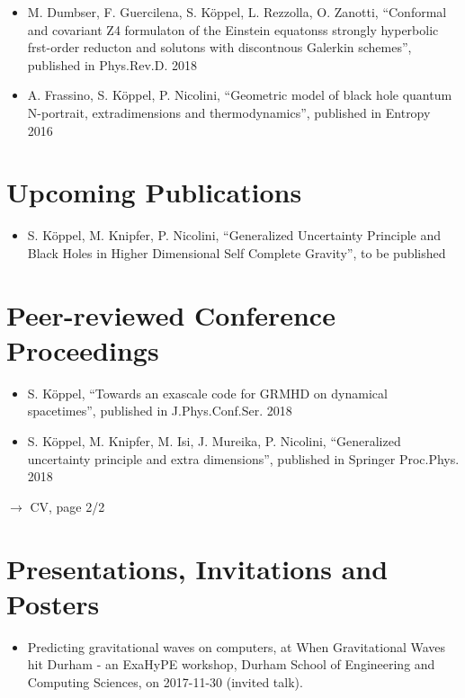 \begin{fullwidth}
\begin{multicols}{2}
\begin{itemize}
    \item
    M. Dumbser, F. Guercilena, S. Köppel, L. Rezzolla, O. Zanotti,
    ``Conformal and covariant Z4 formulaton of the Einstein equatonss strongly 
    hyperbolic frst-order reducton and solutons with discontnous Galerkin 
    schemes'',
    published in Phys.Rev.D. 2018 \cite{Dumbser2017}
   
    \item
    A. Frassino, S. Köppel, P. Nicolini,
    ``Geometric model of black hole quantum N-portrait, extradimensions and 
    thermodynamics'',
    published in Entropy 2016~\cite{FKN16}
\end{itemize}

\section*{Upcoming Publications}
\begin{itemize}
	\item
	S. Köppel, M. Knipfer, P. Nicolini,
	``Generalized Uncertainty Principle and Black
	Holes in Higher Dimensional Self Complete
	Gravity'',
	to be published \cite{Knipfer2019}
\end{itemize}

\section*{Peer-reviewed Conference Proceedings}
\begin{itemize}
	\item
	S. Köppel,
	``Towards an exascale code for GRMHD on dynamical spacetimes'',
	published in J.Phys.Conf.Ser. 2018 \cite{Koeppel2017}
	\item
	S. Köppel, M. Knipfer, M. Isi, J. Mureika, P. Nicolini,
	``Generalized uncertainty principle and extra dimensions'',
	published in Springer Proc.Phys. 2018 \cite{Koppel:2017rsf}
\end{itemize}

\vfill{}
\hfill
\textcolor{black!80!white}{$\to$ CV, page 2/2}

\newpage
\small %
\section*{Presentations, Invitations and Posters}
\begin{itemize}
	\item Predicting gravitational waves on computers, at When Gravitational 
	Waves hit Durham - an ExaHyPE workshop, Durham School of Engineering and 
	Computing Sciences, on 2017-11-30 (invited talk).
	

\end{itemize}
\end{multicols}
\end{fullwidth}
